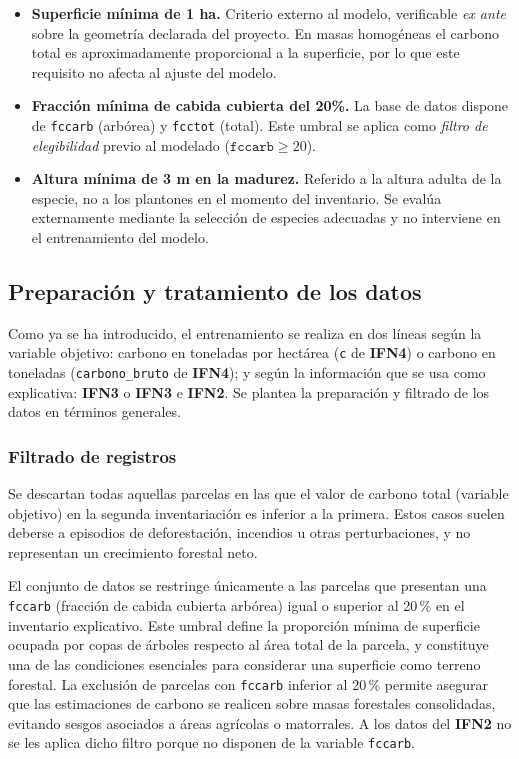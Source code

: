 \begin{itemize}
    \item \textbf{Superficie mínima de 1 ha.} Criterio externo al modelo, verificable \emph{ex ante} sobre la geometría declarada del proyecto. En masas homogéneas el carbono total es aproximadamente proporcional a la superficie, por lo que este requisito no afecta al ajuste del modelo.

    \item \textbf{Fracción mínima de cabida cubierta del 20\%.} La base de datos dispone de \texttt{fccarb} (arbórea) y \texttt{fcctot} (total). Este umbral se aplica como \emph{filtro de elegibilidad} previo al modelado ($\texttt{fccarb} \geq 20$).

    \item \textbf{Altura mínima de 3 m en la madurez.} Referido a la altura adulta de la especie, no a los plantones en el momento del inventario. Se evalúa externamente mediante la selección de especies adecuadas y no interviene en el entrenamiento del modelo.
\end{itemize}

\subsection{Preparación y tratamiento de los datos}

Como ya se ha introducido, el entrenamiento se realiza en dos líneas según la variable objetivo: carbono en toneladas por hectárea (\texttt{c} de \textbf{IFN4}) o carbono en toneladas (\texttt{carbono\_bruto} de \textbf{IFN4}); y según la información que se usa como explicativa: \textbf{IFN3} o \textbf{IFN3} e \textbf{IFN2}. Se plantea la preparación y filtrado de los datos en términos generales.

\subsubsection{Filtrado de registros}\label{subsec:filtradoregistros}

Se descartan todas aquellas parcelas en las que el valor de carbono total (variable objetivo) en la segunda inventariación es inferior a la primera. Estos casos suelen deberse a episodios de deforestación, incendios u otras perturbaciones, y no representan un crecimiento forestal neto.


El conjunto de datos se restringe únicamente a las parcelas que presentan una \texttt{fccarb} (fracción de cabida cubierta arbórea) igual o superior al 20\,\% en el inventario explicativo. Este umbral define la proporción mínima de superficie ocupada por copas de árboles respecto al área total de la parcela, y constituye una de las condiciones esenciales para considerar una superficie como terreno forestal. La exclusión de parcelas con \texttt{fccarb} inferior al 20\,\% permite asegurar que las estimaciones de carbono se realicen sobre masas forestales consolidadas, evitando sesgos asociados a áreas agrícolas o matorrales. A los datos del \textbf{IFN2} no se les aplica dicho filtro porque no disponen de la variable \texttt{fccarb}.


